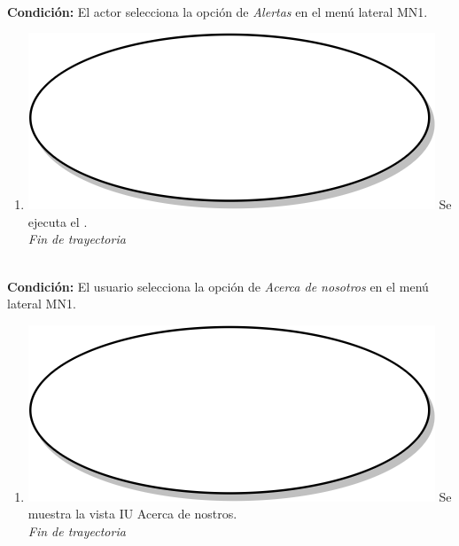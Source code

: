 \textbf{} \\
\textbf{Condición:} El actor selecciona la opción de \textit{Alertas} en el menú lateral MN1. \\
 \begin{enumerate}[label=F\arabic*]
    \item {\includegraphics[scale=.05]{Capitulo3/img/proceso.png} Se ejecuta el \textbf{}.} \\
    \textit{Fin de trayectoria} \\
\end{enumerate}

\textbf{} \\
\textbf{Condición:} El usuario selecciona la opción de \textit{Acerca de nosotros} en el menú lateral MN1. \\
 \begin{enumerate}[label=G\arabic*]
    \item {\includegraphics[scale=.05]{Capitulo3/img/proceso.png} Se muestra la vista IU Acerca de nostros.} \\
    \textit{Fin de trayectoria} \\
\end{enumerate}

